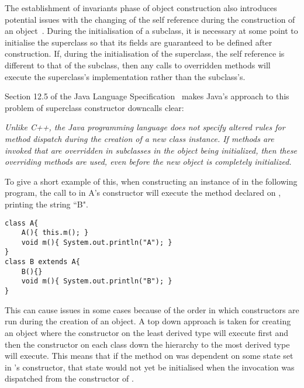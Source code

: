 The establishment of invariants phase of object construction also introduces potential issues with the changing of the self reference during the construction of an object~\cite{SaferConstruction}. During the initialisation of a subclass, it is necessary at some point to initialise the superclass so that its fields are guaranteed to be defined after construction. If, during the initialisation of the superclass, the self reference is different to that of the subclass, then any calls to overridden methods will execute the superclass's implementation rather than the subclass's.
\newline

Section 12.5 of the Java Language Specification~\cite{JavaLangSpec} makes Java's approach to this problem of superclass constructor downcalls clear:
\begin{displayquote}\textit{
		Unlike C++, the Java programming language does not specify altered rules for method dispatch during the creation of a new class instance. If methods are invoked that are overridden in subclasses in the object being initialized, then these overriding methods are used, even before the new object is completely initialized.}~\cite{JavaLangSpec}
\end{displayquote}
To give a short example of this, when constructing an instance of  in the following program, the call to  in A's constructor will execute the method  declared on , printing the string ``B".
\begin{lstlisting}
class A{
	A(){ this.m(); }
	void m(){ System.out.println("A"); }
}
class B extends A{
	B(){}
	void m(){ System.out.println("B"); }
}
\end{lstlisting}

This can cause issues in some cases because of the order in which constructors are run during the creation of an object. A top down approach is taken for creating an object where the constructor on the least derived type will execute first and then the constructor on each class down the hierarchy to the most derived type will execute. This means that if the  method on  was dependent on some state set in 's constructor, that state would not yet be initialised when the invocation was dispatched from the constructor of .

